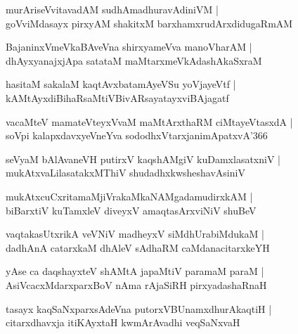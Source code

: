 \documentclass[twoside,12pt,openright]{book}
\newcounter{shloka}[chapter]
\begin{document}
\begin{shloka}%
murAriseVvitavadAM sudhAmadhuravAdiniVM |\\
goVviMdasayx pirxyAM  shakitxM barxhamxrudArxdidugaRmAM 
\end{shloka}

\begin{shloka}%
BajaninxVmeVkaBAveVna shirxyameVva manoVharAM |\\
dhAyxyanajxjApa satataM maMtarxmeVkAdashAkaSxraM 
\end{shloka}

\begin{shloka}%
hasitaM sakalaM kaqtAvxbatamAyeVSu yoVjayeVtf |\\
kAMtAyxdiBihaRsaMtiVBivARsayatayxviBAjagatf
\end{shloka}

\begin{shloka}%
vacaMteV mamateVteyxVvaM maMtArxthaRM ciMtayeVtasxdA |\\
soVpi kalapxdavxyeVneYva sododhxVtarxjanimApatxvA\char'366 
\end{shloka}

\begin{shloka}%
seVyaM bAlAvaneVH putirxV kaqshAMgiV kuDamxlasatxniV |\\
mukAtxvaLilasatakxMThiV shudadhxkwsheshavAsiniV 
\end{shloka}

\begin{shloka}%
mukAtxcuCxritamaMjiVrakaMkaNAMgadamudirxkAM |\\
biBarxtiV kuTamxleV diveyxV amaqtasArxviNiV shuBeV
\end{shloka}

\begin{shloka}%
vaqtakasUtxrikA veVNiV madheyxV siMdhUrabiMdukaM |\\
dadhAnA catarxkaM dhAleV sAdhaRM caMdanacitarxkeYH 
\end{shloka}

\begin{shloka}%
yAse ca daqshayxteV shAMtA japaMtiV paramaM paraM |\\
AsiVcacxMdarxparxBoV nAma rAjaSiRH pirxyadashaRnaH 
\end{shloka}

\begin{shloka}%
tasayx kaqSaNxparxsAdeVna putorxVBUnamxdhurAkaqtiH |\\
citarxdhavxja itiKAyxtaH kwmArAvadhi veqSaNxvaH 
\end{shloka}
\end{document}
